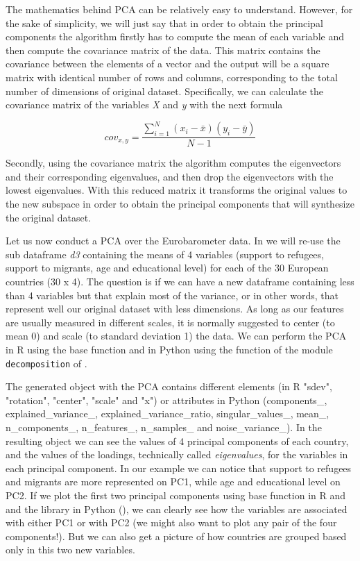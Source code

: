 The mathematics behind PCA can be relatively easy to
understand. However, for the sake of simplicity, we will just say that
in order to obtain the principal components the algorithm firstly has
to compute the mean of each variable and then compute the covariance
matrix of the data. This matrix contains the covariance between the
elements of a vector and the output will be a square matrix with
identical number of rows and columns, corresponding to the total
number of dimensions of original dataset. Specifically, we can
calculate the covariance matrix of the variables \emph{X} and \emph{y}
with the next formula

$$cov_{x,y}=\frac{\sum_{i=1}^{N}(x_{i}-\bar{x})(y_{i}-\bar{y})}{N-1}$$

Secondly, using the covariance matrix the algorithm computes the eigenvectors and their corresponding eigenvalues, and then drop the eigenvectors with the lowest eigenvalues. With this reduced matrix it transforms the original values to the new subspace in order to obtain the principal components that will synthesize the original dataset.

Let us now conduct a PCA over the Eurobarometer data.  In  we will re-use the sub dataframe \emph{d3} containing the means of 4 variables (support to refugees, support to migrants, age and educational level) for each of the 30 European countries (30 x 4). The question is if we can have a new dataframe containing less than 4 variables but that explain most of the variance, or in other words, that represent well our original dataset with less dimensions. As long as our features are usually measured in different scales, it is normally suggested to center (to mean 0) and scale (to standard deviation 1) the data. We can perform the PCA in R using the base function  and in Python using the function  of the module \texttt{decomposition} of . 


The generated object with the PCA contains different elements (in R "sdev",     "rotation", "center",  "scale" and   "x") or attributes in Python (components\_, explained\_variance\_, explained\_variance\_ratio, singular\_values\_, mean\_, n\_components\_, n\_features\_, n\_samples\_ and noise\_variance\_). In the resulting object we can see the values of 4 principal components of each country, and the values of the loadings, technically called \textit{eigenvalues}, for the variables in each principal component. In our example we can notice that support to refugees and migrants are more represented on PC1, while age and educational level on PC2. If we plot the first two principal components using base function  in R and and the library  in Python (), we can clearly see how the variables are associated with either PC1 or with PC2 (we might also want to plot any pair of the four components!). But we can also get a picture of how countries are grouped based only in this two new variables.


